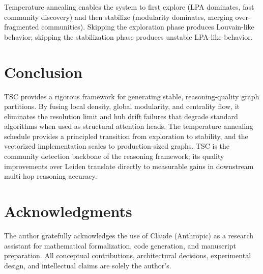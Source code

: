 \documentclass[10pt,twocolumn]{article}
\begin{document}
Temperature annealing enables the system to first explore (LPA dominates, fast community
discovery) and then stabilize (modularity dominates, merging over-fragmented communities).
Skipping the exploration phase produces Louvain-like behavior; skipping the stabilization
phase produces unstable LPA-like behavior.

\section{Conclusion}
\label{sec:conclusion}

TSC provides a rigorous framework for generating stable, reasoning-quality graph
partitions. By fusing local density, global modularity, and centrality flow, it
eliminates the resolution limit and hub drift failures that degrade standard algorithms
when used as structural attention heads. The temperature annealing schedule provides a
principled transition from exploration to stability, and the vectorized implementation
scales to production-sized graphs. TSC is the community detection backbone of the
\CEREBRUM{} reasoning framework; its quality improvements over Leiden translate directly
to measurable gains in downstream multi-hop reasoning accuracy.

\section*{Acknowledgments}
The author gratefully acknowledges the use of Claude (Anthropic) as a research assistant
for mathematical formalization, code generation, and manuscript preparation. All
conceptual contributions, architectural decisions, experimental design, and intellectual
claims are solely the author's.
\end{document}
